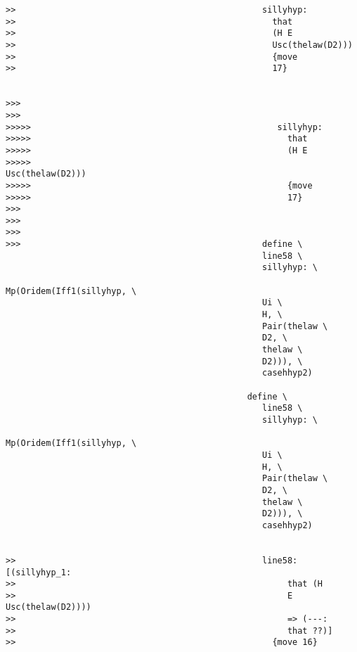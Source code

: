 \documentclass[12pt]{article}
\begin{document}
\begin{verbatim}
>>                                                 sillyhyp:
>>                                                   that
>>                                                   (H E
>>                                                   Usc(thelaw(D2)))
>>                                                   {move
>>                                                   17}


>>>
>>>
>>>>>                                                 sillyhyp:
>>>>>                                                   that
>>>>>                                                   (H E
>>>>>                                                   Usc(thelaw(D2)))
>>>>>                                                   {move
>>>>>                                                   17}
>>>
>>>
>>>
>>>                                                define \
                                                   line58 \
                                                   sillyhyp: \
                                                   Mp(Oridem(Iff1(sillyhyp, \
                                                   Ui \
                                                   H, \
                                                   Pair(thelaw \
                                                   D2, \
                                                   thelaw \
                                                   D2))), \
                                                   casehhyp2)

                                                define \
                                                   line58 \
                                                   sillyhyp: \
                                                   Mp(Oridem(Iff1(sillyhyp, \
                                                   Ui \
                                                   H, \
                                                   Pair(thelaw \
                                                   D2, \
                                                   thelaw \
                                                   D2))), \
                                                   casehhyp2)


>>                                                 line58: [(sillyhyp_1:
>>                                                      that (H
>>                                                      E Usc(thelaw(D2))))
>>                                                      => (---:
>>                                                      that ??)]
>>                                                   {move 16}



\end{verbatim}
\end{document}
